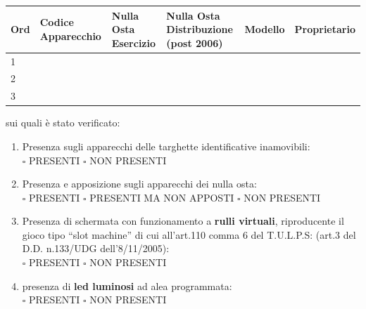 \documentclass[12pt]{article}
\begin{document}
\begin{table}[h]
    \centering
    \begin{tabular}{|p{2.5cm}|p{2.5cm}|p{2.5cm}|p{2.5cm}|p{2.5cm}|p{2.5cm}|}
        \hline
        Ord & Codice \newline Apparecchio & Nulla Osta \newline Esercizio & Nulla Osta \newline Distribuzione \newline (post 2006) & Modello & Proprietario \\
        \hline
        1 \newline &  &  &  &  & \\
        \hline
        2 \newline &  &  &  &  & \\
        \hline
        3 \newline &  &  &  &  & \\
        \hline
    \end{tabular}
\end{table}

sui quali è stato verificato:

\begin{enumerate}[resume]
    \item Presenza sugli apparecchi delle targhette identificative inamovibili:
    \\\begin{math} \square\end{math} PRESENTI \begin{math}\square\end{math} NON PRESENTI
    \item Presenza e apposizione sugli apparecchi dei nulla osta:
    \\\begin{math} \square\end{math} PRESENTI \begin{math}\square\end{math} PRESENTI MA NON APPOSTI \begin{math}\square\end{math} NON PRESENTI
    \item Presenza di schermata con funzionamento a \textbf{rulli virtuali}, riproducente il gioco tipo “slot machine” di cui all’art.110 comma 6 del T.U.L.P.S: (art.3 del D.D. n.133/UDG dell’8/11/2005):
    \\\begin{math} \square\end{math} PRESENTI \begin{math}\square\end{math} NON PRESENTI
    \item presenza di \textbf{led luminosi} ad alea programmata:
    \\\begin{math} \square\end{math} PRESENTI \begin{math}\square\end{math} NON PRESENTI
\end{enumerate}
\end{document}
